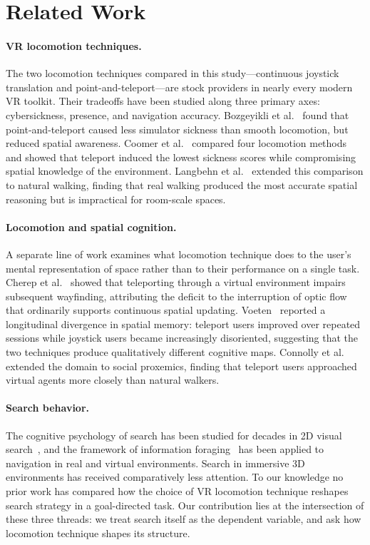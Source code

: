 \documentclass{vgtc}
\begin{document}
\section{Related Work}

\paragraph{VR locomotion techniques.} The two locomotion techniques compared in this study---continuous joystick translation and point-and-teleport---are stock providers in nearly every modern VR toolkit. Their tradeoffs have been studied along three primary axes: cybersickness, presence, and navigation accuracy. Bozgeyikli et al.~\cite{Bozgeyikli:2016:PTL} found that point-and-teleport caused less simulator sickness than smooth locomotion, but reduced spatial awareness. Coomer et al.~\cite{Coomer:2018:EFL} compared four locomotion methods and showed that teleport induced the lowest sickness scores while compromising spatial knowledge of the environment. Langbehn et al.~\cite{Langbehn:2018:ETN} extended this comparison to natural walking, finding that real walking produced the most accurate spatial reasoning but is impractical for room-scale spaces.

\paragraph{Locomotion and spatial cognition.} A separate line of work examines what locomotion technique does to the user's mental representation of space rather than to their performance on a single task. Cherep et al.~\cite{Cherep:2020:STV} showed that teleporting through a virtual environment impairs subsequent wayfinding, attributing the deficit to the interruption of optic flow that ordinarily supports continuous spatial updating. Voeten~\cite{Voeten:2023:LMS} reported a longitudinal divergence in spatial memory: teleport users improved over repeated sessions while joystick users became increasingly disoriented, suggesting that the two techniques produce qualitatively different cognitive maps. Connolly et al.~\cite{Connolly:2025:LIV} extended the domain to social proxemics, finding that teleport users approached virtual agents more closely than natural walkers.

\paragraph{Search behavior.} The cognitive psychology of search has been studied for decades in 2D visual search~\cite{Wolfe:2017:FIT}, and the framework of information foraging~\cite{Pirolli:1999:IF} has been applied to navigation in real and virtual environments. Search in immersive 3D environments has received comparatively less attention. To our knowledge no prior work has compared how the choice of VR locomotion technique reshapes search strategy in a goal-directed task. Our contribution lies at the intersection of these three threads: we treat search itself as the dependent variable, and ask how locomotion technique shapes its structure.
\end{document}
